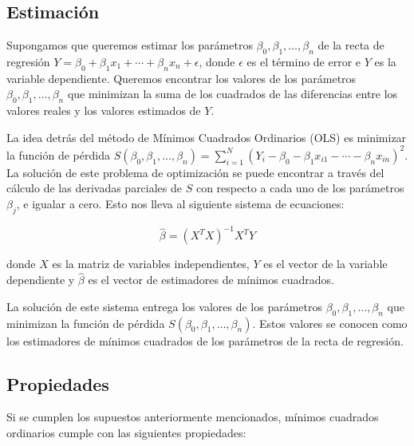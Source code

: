 \documentclass[
]{book}
\begin{document}
\subsection{Estimación}\label{estimaciuxf3n}

Supongamos que queremos estimar los parámetros
\(\beta_0, \beta_1, \ldots, \beta_n\) de la recta de regresión
\(Y = \beta_0 + \beta_1 x_1 + \cdots + \beta_n x_n + \epsilon\), donde
\(\epsilon\) es el término de error e \(Y\) es la variable dependiente.
Queremos encontrar los valores de los parámetros
\(\beta_0, \beta_1, \ldots, \beta_n\) que minimizan la suma de los
cuadrados de las diferencias entre los valores reales y los valores
estimados de \(Y\).

La idea detrás del método de Mínimos Cuadrados Ordinarios (OLS) es
minimizar la función de pérdida
\(S(\beta_0, \beta_1, \ldots, \beta_n) = \sum_{i=1}^N (Y_i - \beta_0 - \beta_1 x_{i1} - \cdots - \beta_n x_{in})^2\).
La solución de este problema de optimización se puede encontrar a través
del cálculo de las derivadas parciales de \(S\) con respecto a cada uno de
los parámetros \(\beta_j\), e igualar a cero. Esto nos lleva al siguiente
sistema de ecuaciones:

\[\hat{\beta}=(X^TX)^{-1}X^TY\]

donde \(X\) es la matriz de variables independientes, \(Y\) es el vector de
la variable dependiente y \(\hat{\beta}\) es el vector de estimadores de
mínimos cuadrados.

La solución de este sistema entrega los valores de los parámetros
\(\beta_0, \beta_1, \ldots, \beta_n\) que minimizan la función de pérdida
\(S(\beta_0, \beta_1, \ldots, \beta_n)\). Estos valores se conocen como
los estimadores de mínimos cuadrados de los parámetros de la recta de
regresión.

\subsection{Propiedades}\label{propiedades}

Si se cumplen los supuestos anteriormente mencionados, mínimos cuadrados
ordinarios cumple con las siguientes propiedades:
\end{document}
